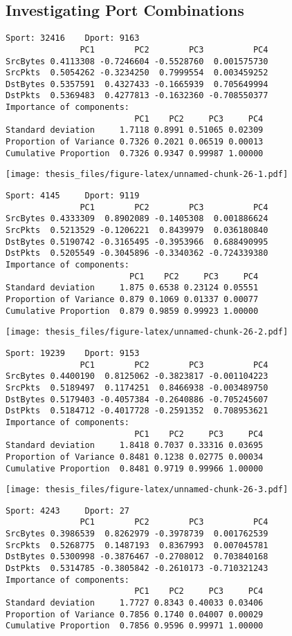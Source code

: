 \documentclass[12pt,twoside]{dukestatscithesis}
\theoremstyle{definition}
\theoremstyle{definition}
\theoremstyle{definition}
\theoremstyle{remark}
\begin{document}
\subsection{Investigating Port
Combinations}\label{investigating-port-combinations}
\begin{verbatim}
Sport: 32416    Dport: 9163 
               PC1        PC2        PC3          PC4
SrcBytes 0.4113308 -0.7246604 -0.5528760  0.001575730
SrcPkts  0.5054262 -0.3234250  0.7999554  0.003459252
DstBytes 0.5357591  0.4327433 -0.1665939  0.705649994
DstPkts  0.5369483  0.4277813 -0.1632360 -0.708550377
Importance of components:
                          PC1    PC2     PC3     PC4
Standard deviation     1.7118 0.8991 0.51065 0.02309
Proportion of Variance 0.7326 0.2021 0.06519 0.00013
Cumulative Proportion  0.7326 0.9347 0.99987 1.00000
\end{verbatim}
\texttt{[image: thesis\_files/figure-latex/unnamed-chunk-26-1.pdf]}
\begin{verbatim}
Sport: 4145     Dport: 9119 
               PC1        PC2        PC3          PC4
SrcBytes 0.4333309  0.8902089 -0.1405308  0.001886624
SrcPkts  0.5213529 -0.1206221  0.8439979  0.036180840
DstBytes 0.5190742 -0.3165495 -0.3953966  0.688490995
DstPkts  0.5205549 -0.3045896 -0.3340362 -0.724339380
Importance of components:
                         PC1    PC2     PC3     PC4
Standard deviation     1.875 0.6538 0.23124 0.05551
Proportion of Variance 0.879 0.1069 0.01337 0.00077
Cumulative Proportion  0.879 0.9859 0.99923 1.00000
\end{verbatim}
\texttt{[image: thesis\_files/figure-latex/unnamed-chunk-26-2.pdf]}
\begin{verbatim}
Sport: 19239    Dport: 9153 
               PC1        PC2        PC3          PC4
SrcBytes 0.4400190  0.8125062 -0.3823817 -0.001104223
SrcPkts  0.5189497  0.1174251  0.8466938 -0.003489750
DstBytes 0.5179403 -0.4057384 -0.2640886 -0.705245607
DstPkts  0.5184712 -0.4017728 -0.2591352  0.708953621
Importance of components:
                          PC1    PC2     PC3     PC4
Standard deviation     1.8418 0.7037 0.33316 0.03695
Proportion of Variance 0.8481 0.1238 0.02775 0.00034
Cumulative Proportion  0.8481 0.9719 0.99966 1.00000
\end{verbatim}
\texttt{[image: thesis\_files/figure-latex/unnamed-chunk-26-3.pdf]}
\begin{verbatim}
Sport: 4243     Dport: 27 
               PC1        PC2        PC3          PC4
SrcBytes 0.3986539  0.8262979 -0.3978739  0.001762539
SrcPkts  0.5268775  0.1487193  0.8367993  0.007045781
DstBytes 0.5300998 -0.3876467 -0.2708012  0.703840168
DstPkts  0.5314785 -0.3805842 -0.2610173 -0.710321243
Importance of components:
                          PC1    PC2     PC3     PC4
Standard deviation     1.7727 0.8343 0.40033 0.03406
Proportion of Variance 0.7856 0.1740 0.04007 0.00029
Cumulative Proportion  0.7856 0.9596 0.99971 1.00000
\end{verbatim}
\end{document}
